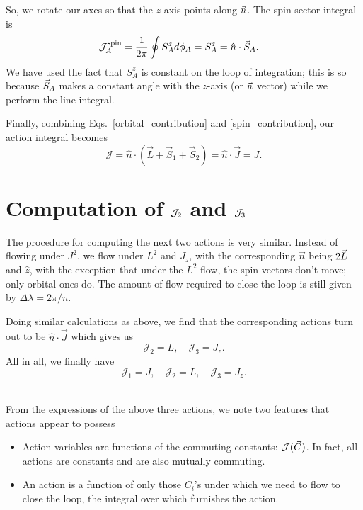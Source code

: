 \hfill \break


So, we rotate our axes so that the $z$-axis points along $\vec{n}$.
The spin sector integral is 
\begin{align}
\mathcal{J}_{A}^{\mathrm{spin}}   =\frac{1}{2 \pi} \oint S_{A}^{z} d \phi_{A} 
  & =    S_{A}^{z}   =  \hat{n} \cdot \vec{S}_A.   \label{spin_contribution}
\end{align}
We have used the fact that $S_{A}^{z}$ is constant on the loop of integration;
this is so because $\vec{S}_A$ makes a constant angle with the $z$-axis 
(or $\vec{n}$ vector) while we perform the line integral.



Finally, combining Eqs.~\eqref{orbital_contribution} and \eqref{spin_contribution},
our action integral becomes 
\begin{equation}
\mathcal{J}=\hat{n} \cdot\left(\vec{L}+\vec{S}_{1}+\vec{S}_{2}\right)=\hat{n} \cdot \vec{J} = J.
\end{equation}




\section{Computation of $\mathcal{J}_2$ and $\mathcal{J}_3$}

The procedure for computing the next two actions is very similar.
Instead of flowing under $J^2$, we flow under $L^2$ and $J_z$,
with the corresponding $\vec{n}$ being $2 \vec{L}$ and $\hat{z}$,
with the exception that under the $L^2$ flow, the spin vectors
don't move; only orbital ones do.
The amount of flow required to close the loop is still given by
$\Delta \lambda = 2 \pi/n$.


Doing similar calculations as above, we find that the 
corresponding actions turn out to be $\hat{n} \cdot \vec{J}$
which gives us 
\begin{equation}
\mathcal{J}_{2}= L , \quad \mathcal{J}_{3}=  J_z.
\end{equation}
All in all, we finally have 
\begin{equation}
\mathcal{J}_{1}= J, \quad\mathcal{J}_{2}= L , \quad \mathcal{J}_{3}=  J_z.
\end{equation} \\



\begin{tcolorbox}
From the expressions of the above three actions, we note two features
that actions appear to possess
\begin{itemize}
\item Action variables are functions of the commuting constants: $\mathcal{J}(\vec{C})$.
In fact, all actions are constants and are also mutually commuting. 
\item An action is a function of only those $C_i$'s under which we need to flow
to close the loop, the integral over which furnishes the action. 
\end{itemize}
\end{tcolorbox}






